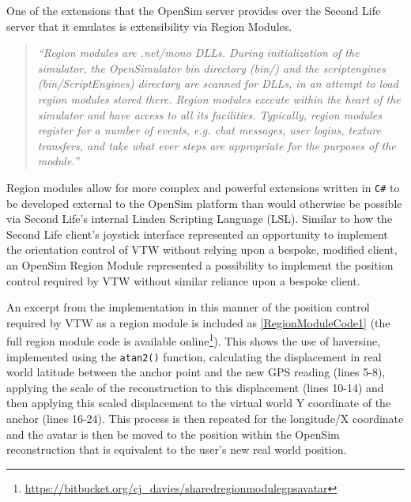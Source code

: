 \newcommand{\RegionModuleCodeFootnote}{\footnote{\url{https://bitbucket.org/cj_davies/sharedregionmodulegpsavatar}}}


One of the extensions that the OpenSim server provides over the Second Life server that it emulates is extensibility via Region Modules.

\begin{quotation}
	\textit{``Region modules are .net/mono DLLs. During initialization of the simulator, the OpenSimulator bin directory (bin/) and the scriptengines (bin/ScriptEngines) directory are scanned for DLLs, in an attempt to load region modules stored there. Region modules execute within the heart of the simulator and have access to all its facilities. Typically, region modules register for a number of events, e.g. chat messages, user logins, texture transfers, and take what ever steps are appropriate for the purposes of the module.''}\RegionModuleFootnote{}
\end{quotation}

Region modules allow for more complex and powerful extensions written in \texttt{C\#} to be developed external to the OpenSim platform than would otherwise be possible via Second Life's internal Linden Scripting Language (LSL). Similar to how the Second Life client's joystick interface represented an opportunity to implement the orientation control of VTW without relying upon a bespoke, modified client, an OpenSim Region Module represented a possibility to implement the position control required by VTW without similar reliance upon a bespoke client.

An excerpt from the implementation in this manner of the position control required by VTW as a region module is included as \ref{RegionModuleCode1} (the full region module code is available online\RegionModuleCodeFootnote{}). This shows the use of haversine, implemented using the \texttt{atan2()} function, calculating the displacement in real world latitude between the anchor point and the new GPS reading (lines 5-8), applying the scale of the reconstruction to this displacement (lines 10-14) and then applying this scaled displacement to the virtual world Y coordinate of the anchor (lines 16-24). This process is then repeated for the longitude/X coordinate and the avatar is then be moved to the position within the OpenSim reconstruction that is equivalent to the user's new real world position.

